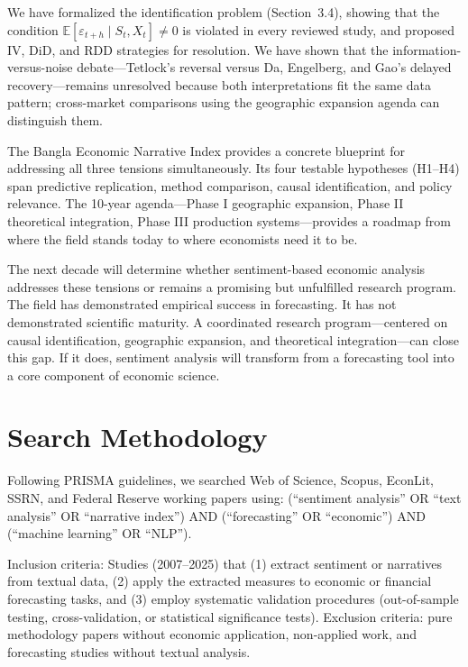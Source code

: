 \documentclass[11pt]{article}
\begin{document}
We have formalized the identification problem (Section~3.4), showing that the condition $\mathbb{E}[\varepsilon_{t+h} \mid S_t, X_t] \neq 0$ is violated in every reviewed study, and proposed IV, DiD, and RDD strategies for resolution. We have shown that the information-versus-noise debate---Tetlock's reversal versus Da, Engelberg, and Gao's delayed recovery---remains unresolved because both interpretations fit the same data pattern; cross-market comparisons using the geographic expansion agenda can distinguish them.

The Bangla Economic Narrative Index provides a concrete blueprint for addressing all three tensions simultaneously. Its four testable hypotheses (H1--H4) span predictive replication, method comparison, causal identification, and policy relevance. The 10-year agenda---Phase I geographic expansion, Phase II theoretical integration, Phase III production systems---provides a roadmap from where the field stands today to where economists need it to be.

The next decade will determine whether sentiment-based economic analysis addresses these tensions or remains a promising but unfulfilled research program. The field has demonstrated empirical success in forecasting. It has not demonstrated scientific maturity. A coordinated research program---centered on causal identification, geographic expansion, and theoretical integration---can close this gap. If it does, sentiment analysis will transform from a forecasting tool into a core component of economic science.

\appendix

\section{Search Methodology}

Following PRISMA guidelines, we searched Web of Science, Scopus, EconLit, SSRN, and Federal Reserve working papers using: (``sentiment analysis'' OR ``text analysis'' OR ``narrative index'') AND (``forecasting'' OR ``economic'') AND (``machine learning'' OR ``NLP'').

Inclusion criteria: Studies (2007--2025) that (1) extract sentiment or narratives from textual data, (2) apply the extracted measures to economic or financial forecasting tasks, and (3) employ systematic validation procedures (out-of-sample testing, cross-validation, or statistical significance tests). Exclusion criteria: pure methodology papers without economic application, non-applied work, and forecasting studies without textual analysis.
\end{document}
